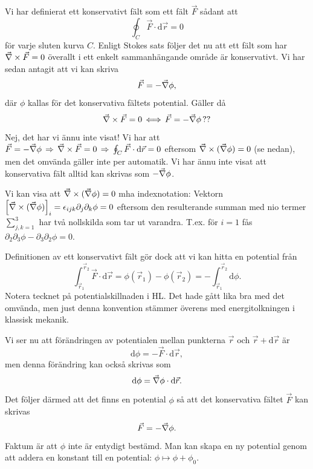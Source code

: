 \documentclass[%
oneside,                 %
final,                   %
10pt]{article}
\newenvironment{notice_mdfboxadmon}[1][]{
\begin{notice_mdfboxmdframed}[frametitle=#1]
}
{
\end{notice_mdfboxmdframed}
}
\begin{document}
Vi har definierat ett konservativt fält som ett fält $\vec{F}$ sådant att
\begin{equation}
  \oint_C \vec{F}\cdot \mbox{d}\vec{r} = 0
\end{equation}
för varje sluten kurva $C$.  Enligt Stokes sats följer det nu att ett fält som har $\vec{\nabla} \times \vec{F} = 0$ överallt i ett enkelt sammanhängande område är konservativt. Vi har sedan antagit att vi kan skriva
\begin{equation}
\vec{F} = - \vec{\nabla} \phi,
\end{equation}
där $\phi$ kallas för det konservativa fältets potential. Gäller då 
$$
\vec{\nabla} \times \vec{F} = 0 \, \Longleftrightarrow \, \vec{F} = - \vec{\nabla} \phi \, ??
$$
Nej, det har vi ännu inte visat! Vi har att $\vec{F} = - \vec{\nabla} \phi \, \Rightarrow \, \vec{\nabla} \times \vec{F} = 0 \, \Rightarrow \, \oint_C \vec{F}\cdot \mbox{d}\vec{r} = 0$ eftersom $\vnabla \times ( \vnabla \phi) = 0$ (se nedan), men det omvända gäller inte per automatik. Vi har ännu inte visat att konservativa fält alltid kan skrivas som $-\vec{\nabla} \phi$.


\begin{notice_mdfboxadmon}[Bevis av $\vnabla \times ( \vnabla \phi) = 0$ mha indexnotation]
Vi kan visa att $\vnabla \times ( \vnabla \phi) = 0$ mha indexnotation: Vektorn $\left[ \vec{\nabla} \times ( \vec{\nabla} \phi) \right]_i = \epsilon_{ijk} \partial_j \partial_k \phi = 0$ eftersom den resulterande summan med nio termer $\sum_{j,k=1}^3$ har två nollskilda som tar ut varandra. T.ex. för $i=1$ fås $\partial_2\partial_3 \phi - \partial_3\partial_2 \phi = 0$.
\end{notice_mdfboxadmon} %



Definitionen av ett konservativt fält gör dock att vi kan hitta en potential från
\begin{equation}
  \int_{\vec{r}_1}^{\vec{r}_2} \vec{F} \cdot \mbox{d} \vec{r} = \phi\left( \vec{r}_1 \right) - \phi\left( \vec{r}_2 \right) = - \int_{\vec{r}_1}^{\vec{r}_2} \mbox{d} \phi.
\end{equation}
Notera tecknet på potentialskillnaden i HL. Det hade gått lika bra med det omvända, men just denna konvention stämmer överens med energitolkningen i klassisk mekanik.

Vi ser nu att förändringen av potentialen mellan punkterna $\vec{r}$ och $\vec{r} + \mbox{d}\vec{r}$ är
\begin{equation}
  \mbox{d}\phi = -\vec{F}\cdot \mbox{d}\vec{r},
\end{equation}
men denna förändring kan också skrivas som
\begin{equation}
  \mbox{d}\phi = \vec{\nabla} \phi \cdot \mbox{d}\vec{r}.
\end{equation}
Det följer därmed att det finns en potential $\phi$ så att det konservativa fältet $\vec{F}$ kan skrivas
\begin{equation}
  \vec{F} = -\vec{\nabla} \phi.
\end{equation}
Faktum är att $\phi$ inte är entydigt bestämd.  Man kan skapa en ny potential genom att addera en konstant till en potential: $\phi \mapsto \phi + \phi_0$.
\end{document}
